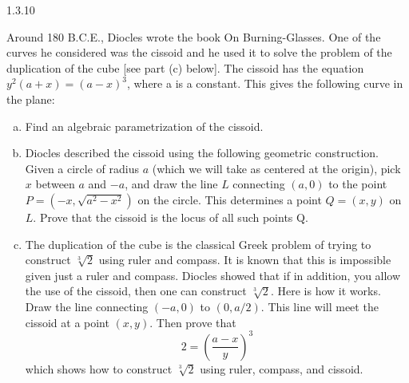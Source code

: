 \documentclass[twoside]{article}
\begin{document}
\begin{ejercicio}{1.3.10}

\end{ejercicio} Around 180 B.C.E., Diocles wrote the book On Burning-Glasses. One of the curves he considered was the cissoid and he used it to solve the problem of the duplication of the cube [see part (c) below]. The cissoid has the equation $y^2(a + x) = (a − x)^3$, where a is
a constant. This gives the following curve in the plane:
\begin{enumerate}[a.]
\item Find an algebraic parametrization of the cissoid.
\item Diocles described the cissoid using the following geometric construction. Given a circle of radius $a$ (which we will take as centered at the origin), pick $x$ between $a$ and $−a$, and draw the line $L$ connecting $(a, 0)$ to the point $P = (−x,\sqrt{a^2 − x^2})$ on the
circle. This determines a point $Q = (x, y)$ on $L$. Prove that the cissoid is the locus of all such points Q.
\item The duplication of the cube is the classical Greek problem of trying to construct $\sqrt[3]{2}$ using ruler and compass. It is known that this is impossible given just a ruler and  compass. Diocles showed that if in addition, you allow the use of the cissoid, then
one can construct $\sqrt[3]{2}$. Here is how it works. Draw the line connecting $(−a, 0)$ to $(0, a/2)$. This line will meet the cissoid at a point $(x, y)$. Then prove that
$$
2=\left(\frac{a-x}{y}\right)^3
$$
which shows how to construct $\sqrt[3]{2}$ using ruler, compass, and cissoid.
\end{enumerate}
\end{document}
